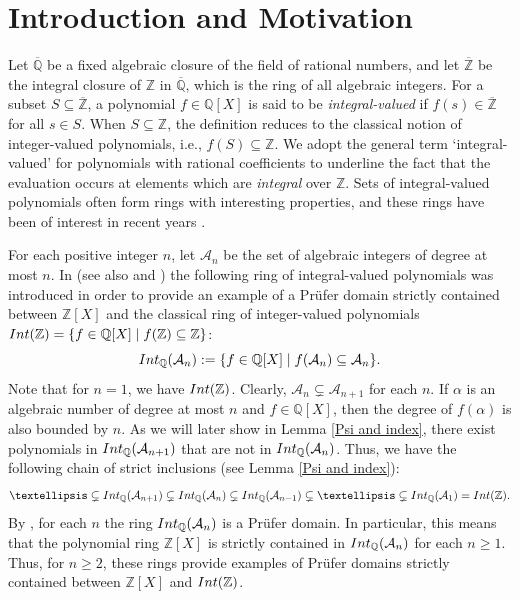 \documentclass{article}
\theoremstyle{definition}\newtheorem{Def}[equation]{Definition}
\theoremstyle{definition}\newtheorem{Ques}[equation]{Question}
\theoremstyle{definition}\newtheorem{Conj}[equation]{Conjecture}
\theoremstyle{definition}\newtheorem{Not}[equation]{Notation}
\newcommand{\Q}{\mathbb{Q}}
\newcommand{\oQ}{\overline{\Q}}
\newcommand{\oZ}{\overline{\Z}}
\newcommand{\Z}{\mathbb{Z}}
\newcommand{\Int}{\textnormal{Int}}
\newcommand{\IntQ}{\Int_{\Q}}
\newcommand{\An}{\mathcal{A}_n}
\numberwithin{equation}{section}
\begin{document}
\section{Introduction and Motivation}
\let\thefootnote\relax{}
Let $\oQ$ be a fixed algebraic closure of the field of rational numbers, and let $\oZ$ be the integral closure of $\Z$ in $\oQ$, which is the ring of all algebraic integers. For a subset $S \subseteq \oZ$, a polynomial $f \in \Q[X]$ is said to be \textit{integral-valued} if $f(s) \in \oZ$ for all $s \in S$. When $S\subseteq\Z$, the definition reduces to the classical notion of integer-valued polynomials, i.e., $f(S)\subseteq\Z$. We adopt the general term `integral-valued' for polynomials with rational coefficients to underline the fact that the evaluation occurs at elements which are \textit{integral} over $\Z$. Sets of integral-valued polynomials often form rings with interesting properties, and these rings have been of interest in recent years \cite{ChabPer, HLP, LopWer, Mulay, Per1, PerWer}.%

For each positive integer $n$, let $\An$ be the set of algebraic integers of degree at most $n$. In \cite{LopWer} (see also \cite{Per1} and \cite{PerWer}) the following ring of integral-valued polynomials was introduced in order to provide an example of a Pr\"ufer domain strictly contained between $\Z[X]$ and the classical ring of integer-valued polynomials $\Int(\Z)=\{f\in\Q[X] \mid f(\Z)\subseteq\Z\}$:
\begin{equation*}
\IntQ(\An):=\{f\in\Q[X] \mid f(\An)\subseteq\An\}.
\end{equation*}
Note that for $n=1$, we have $\Int(\Z)$. Clearly, $\An\subsetneq\mathcal{A}_{n+1}$ for each $n$. If $\alpha$ is an algebraic number of degree at most $n$ and $f\in\Q[X]$, then the degree of $f(\alpha)$ is also bounded by $n$. As we will later show in Lemma \ref{Psi and index}, there exist polynomials in $\Int_{\Q}(\mathcal{A}_{n+1})$ that are not in $\Int_{\Q}(\An)$. Thus, we have the following chain of strict inclusions (see Lemma \ref{Psi and index}):
\begin{equation}\label{An inclusion chain}
\ldots \subsetneq \Int_{\Q}(\mathcal{A}_{n+1}) \subsetneq \Int_{\Q}(\An) \subsetneq \Int_{\Q}(\mathcal{A}_{n-1}) \subsetneq \ldots \subsetneq \Int_{\Q}(\mathcal{A}_1)=\Int(\Z).
\end{equation}
By \cite[Theorem 3.9]{LopWer}, for each $n$ the ring $\IntQ(\An)$ is a Pr\"{u}fer domain. In particular, this means that the polynomial ring $\Z[X]$ is strictly contained in $\IntQ(\An)$ for each $n\geq 1$. Thus, for $n\geq2$, these rings provide examples of Pr\"ufer domains strictly contained between $\Z[X]$ and $\Int(\Z)$.
\end{document}
